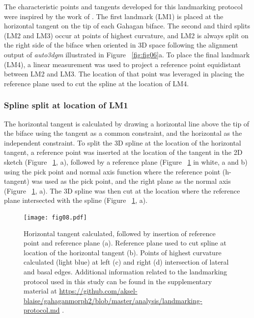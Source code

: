 \documentclass[review]{elsarticle}
\begin{document}
The characteristic points and tangents developed for this landmarking protocol were inspired by the work of \citet{RN11786}. The first landmark (LM1) is placed at the horizontal tangent on the tip of each Gahagan biface. The second and third splits (LM2 and LM3) occur at points of highest curvature, and LM2 is always split on the right side of the biface when oriented in 3D space following the alignment output of \textit{auto3dgm} illustrated in Figure ~\ref{fig:fig06}a. To place the final landmark (LM4), a linear measurement was used to project a reference point equidistant between LM2 and LM3. The location of that point was leveraged in placing the reference plane used to cut the spline at the location of LM4.

\subsubsection*{Spline split at location of LM1}

The horizontal tangent is calculated by drawing a horizontal line above the tip of the biface using the tangent as a common constraint, and the horizontal as the independent constraint. To split the 3D spline at the location of the horizontal tangent, a reference point was inserted at the location of the tangent in the 2D sketch (Figure ~\ref{fig:fig08}, a), followed by a reference plane (Figure ~\ref{fig:fig08} in white, a and b) using the pick point and normal axis function where the reference point (h-tangent) was used as the pick point, and the right plane as the normal axis (Figure ~\ref{fig:fig08}, a). The 3D spline was then cut at the location where the reference plane intersected with the spline (Figure ~\ref{fig:fig08}, a).

\begin{figure}[h!]\centering
\texttt{[image: fig08.pdf]}
\caption{Horizontal tangent calculated, followed by insertion of reference point and reference plane (a). Reference plane used to cut spline at location of the horizontal tangent (b). Points of highest curvature calculated (light blue) at left (c) and right (d) intersection of lateral and basal edges. Additional information related to the landmarking protocol used in this study can be found in the supplementary material at \href{https://github.com/aksel-blaise/gahaganmorph2/blob/master/analysis/landmarking-protocol.md}{https://github.com/aksel-blaise/gahaganmorph2/blob/master/analysis/landmarking-protocol.md} \citep{RN20850}.}
\label{fig:fig08}
\end{figure}
\end{document}
